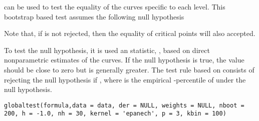 %
\begin{Description}\relax
{}  can be used to test the equality of the  curves specific to each level. This bootstrap based test assumes the  following null hypothesis


Note that, if  is not rejected, then the equality of critical points will also accepted. 

To test the null hypothesis, it is used an statistic, , based on direct nonparametric estimates of the curves. If the null hypothesis is true, the  value should be close to zero but is generally greater. The test rule based on  consists of rejecting the null hypothesis if , where  is the empirical -percentile of  under the null hypothesis. 
\end{Description}
%
\begin{Usage}
\begin{verbatim}
globaltest(formula,data = data, der = NULL, weights = NULL, nboot = 200, h = -1.0, nh = 30, kernel = 'epanech', p = 3, kbin = 100)
\end{verbatim}
\end{Usage}
%
